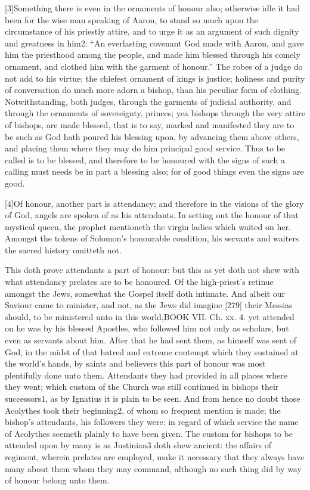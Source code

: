[3]Something there is even in the ornaments of honour also; otherwise idle it had been for the wise man speaking of Aaron, to stand so much upon the circumstance of his priestly attire, and to urge it as an argument of such dignity and greatness in him2: “An everlasting covenant God made with Aaron, and gave him the priesthood among the people, and made him blessed through his comely ornament, and clothed him with the garment of honour.” The robes of a judge do not add to his virtue; the chiefest ornament of kings is justice; holiness and purity of conversation do much more adorn a bishop, than his peculiar form of clothing. Notwithstanding, both judges, through the garments of judicial authority, and through the ornaments of sovereignty, princes; yea bishops through the very attire of bishops, are made blessed, that is to say, marked and manifested they are to be such as God hath poured his blessing upon, by advancing them above others, and placing them where they may do him principal good service. Thus to be called is to be blessed, and therefore to be honoured with the signs of such a calling must needs be in part a blessing also; for of good things even the signs are good.

[4]Of honour, another part is attendancy; and therefore in the visions of the glory of God, angels are spoken of as his attendants. In setting out the honour of that mystical queen, the prophet mentioneth the virgin ladies which waited on her. Amongst the tokens of Solomon’s honourable condition, his servants and waiters the sacred history omitteth not.

This doth prove attendants a part of honour: but this as yet doth not shew with what attendancy prelates are to be honoured. Of the high-priest’s retinue amongst the Jews, somewhat the Gospel itself doth intimate. And albeit our Saviour came to minister, and not, as the Jews did imagine [279] their Messias should, to be ministered unto in this world,BOOK VII. Ch. xx. 4. yet attended on he was by his blessed Apostles, who followed him not only as scholars, but even as servants about him. After that he had sent them, as himself was sent of God, in the midst of that hatred and extreme contempt which they sustained at the world’s hands, by saints and believers this part of honour was most plentifully done unto them. Attendants they had provided in all places where they went; which custom of the Church was still continued in bishops their successors1, as by Ignatius it is plain to be seen. And from hence no doubt those Acolythes took their beginning2, of whom so frequent mention is made; the bishop’s attendants, his followers they were: in regard of which service the name of Acolythes seemeth plainly to have been given. The custom for bishops to be attended upon by many is as Justinian3 doth shew ancient: the affairs of regiment, wherein prelates are employed, make it necessary that they always have many about them whom they may command, although no such thing did by way of honour belong unto them.

